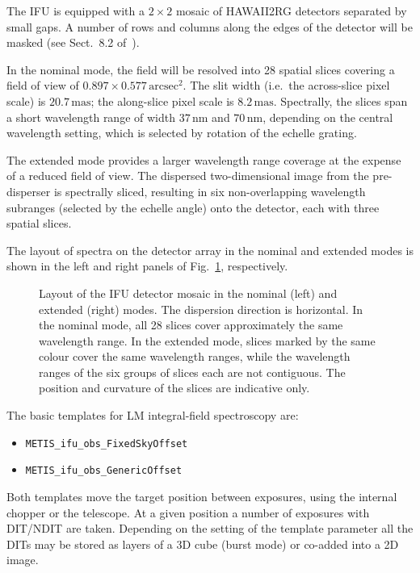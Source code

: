 The IFU is equipped with a $2\times2$ mosaic of HAWAII2RG detectors
separated by small gaps. A number of rows and columns along the edges
of the detector will be masked (see Sect.~8.2 of~\cite{DRLS}).

In the nominal mode, the field will be resolved into 28 spatial slices
covering a field of view of $0.897\times0.577\,\mathrm{arcsec^{2}}$.
The slit width (i.e.\ the across-slice pixel scale) is
$20.7\,\mathrm{mas}$; the along-slice pixel scale is
$8.2\,\mathrm{mas}$. Spectrally, the slices span a short wavelength
range of width $37\,\mathrm{nm}$ and $70\,\mathrm{nm}$, depending on
the central wavelength setting, which is selected by rotation of the
echelle grating.

The extended mode provides a larger wavelength range coverage at the
expense of a reduced field of view. The dispersed two-dimensional
image from the pre-disperser is spectrally sliced, resulting in six
non-overlapping wavelength subranges (selected by the echelle angle)
onto the detector, each with three spatial slices.

The layout of spectra on the detector array in the nominal and
extended modes is shown in the left and right panels of
Fig.~\ref{fig:IFU_detector_layout}, respectively.

\begin{figure}[ht]
  \centering
  \hfill
  \caption[IFU detector layout]{Layout of the IFU detector mosaic
    in the nominal (left) and extended (right) modes. The dispersion
    direction is horizontal. In the nominal mode, all 28 slices cover
    approximately the same wavelength range. In the extended mode, slices marked by
    the same colour cover the same wavelength ranges, while the
    wavelength ranges of the six groups of slices each are not
    contiguous. The position and curvature of the slices are
    indicative only. }
  \label{fig:IFU_detector_layout}
\end{figure}

The basic templates for LM integral-field spectroscopy are:
\begin{itemize}
\item \lstinline{METIS_ifu_obs_FixedSkyOffset}
\item \lstinline{METIS_ifu_obs_GenericOffset}
\end{itemize}
Both templates move the target position between exposures, using the
internal chopper or the telescope. At a given position a number of
exposures with DIT/NDIT are taken. Depending on the setting of the
template parameter  all the DITs may be stored as
layers of a 3D cube (burst mode) or co-added into a 2D image.

